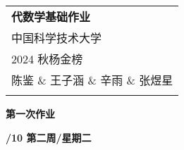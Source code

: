 \documentclass[a4paper,12pt]{article}
\begin{document}
 

\def\head{\begin{tabular}{p{15.5cm}} %
{\large \bf 代数学基础作业} \\
中国科学技术大学 \\ 2024 秋\quad 杨金榜  \\ 陈鉴 \& 王子涵 \& 辛雨 \& 张煜星\\
\hline %
\\
\end{tabular} %

\vspace*{0.3cm}}%
\head

\begin{center} %
	{\Large \bf 第一次作业} %
	\vspace{2mm}
	
	{\bf{}/10 \quad  第二周/星期二} %

\end{center}  
\end{document}
